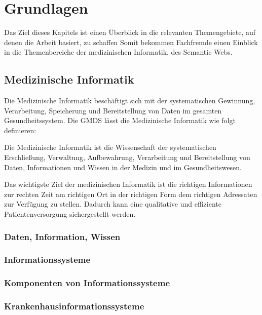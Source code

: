 \chapter{Grundlagen}\label{ch:preliminaries}

Das Ziel dieses Kapitels ist einen Überblick in die relevanten Themengebiete, auf denen die Arbeit basiert, zu schaffen
Somit bekommen Fachfremde einen Einblick in die Themenbereiche der medizinischen Informatik, des Semantic Webs.

\section{Medizinische Informatik}\label{sec:mi}

Die Medizinische Informatik beschäftigt sich mit der systematischen Gewinnung, Verarbeitung, Speicherung und Bereitstellung von Daten im gesamten Gesundheitssystem. 
Die \ac{GMDS} lässt die Medizinische Informatik wie folgt definieren:

\begin{definition}
	Die Medizinische Informatik ist die Wissenschaft der systematischen Erschließung, Verwaltung, Aufbewahrung, Verarbeitung und Bereitstellung von Daten, Informationen und 			Wissen in der Medizin und im Gesundheitswesen.
\end{definition}

\noindent Das wichtigste Ziel der medizinischen Informatik ist die richtigen Informationen zur rechten Zeit am richtigen Ort in der richtigen Form dem richtigen Adressaten zur Verfügung zu stellen. 
Dadurch kann eine qualitative und effiziente Patientenversorgung sichergestellt werden. \citep[vgl.]{winter_health_2011}

\subsection{Daten, Information, Wissen}

\subsection{Informationssysteme}

\subsection{Komponenten von Informationssysteme}

\subsection{Krankenhausinformationssysteme}

